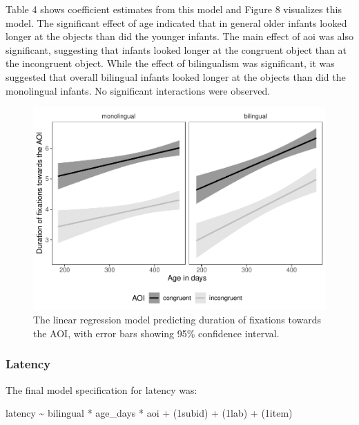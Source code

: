 \documentclass[,man,floatsintext]{apa6}
\begin{document}
\noindent Table 4 shows coefficient estimates from this model and Figure 8 visualizes this model. The significant effect of age indicated that in general older infants looked longer at the objects than did the younger infants. The main effect of aoi was also significant, suggesting that infants looked longer at the congruent object than at the incongruent object. While the effect of bilingualism was significant, it was suggested that overall bilingual infants looked longer at the objects than did the monolingual infants. No significant interactions were observed.

\begin{figure}
\centering
\includegraphics{gaze-following-paper_files/figure-latex/fig8-1.pdf}
\caption{\label{fig:fig8}The linear regression model predicting duration of fixations towards the AOI, with error bars showing 95\% confidence interval.}
\end{figure}

\hypertarget{latency-1}{%
\subsubsection{Latency}\label{latency-1}}

The final model specification for latency was:

latency \textasciitilde{} bilingual * age\_days * aoi +
(1\textbar{}subid) +
(1\textbar{}lab) +
(1\textbar{}item)
\end{document}
